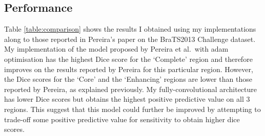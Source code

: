 \documentclass[12pt,a4paper,twoside,openright]{report}
\begin{document}
\subsection{Performance}
Table \ref{table:comparison} shows the results I obtained using my implementations along to those reported in Pereira's paper on the BraTS2013 Challenge dataset. My implementation of the model proposed by Pereira et al.\ with adam optimisation has the highest Dice score for the `Complete' region and therefore improves on the results reported by Pereira for this particular region. However, the Dice scores for the `Core' and the `Enhancing' regions are lower than those reported by Pereira, as explained previously. My fully-convolutional architecture has lower Dice scores but obtains the highest positive predictive value on all 3 regions. This suggest that this model could further be improved by attempting to trade-off some positive predictive value for sensitivity to obtain higher dice scores. 

\begin{table}[h]
\centering	
{}
\caption{Comparison of model performances on the Brats2013 Challenge dataset.}
\label{table:comparison}
\end{table}
\end{document}
